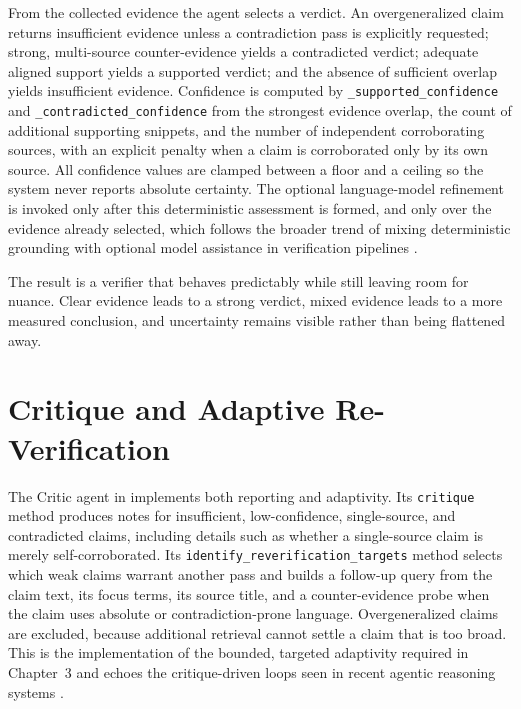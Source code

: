 From the collected evidence the agent selects a verdict. An overgeneralized claim returns insufficient evidence
unless a contradiction pass is explicitly requested; strong, multi-source counter-evidence yields a contradicted
verdict; adequate aligned support yields a supported verdict; and the absence of sufficient overlap yields
insufficient evidence. Confidence is computed by \texttt{\_supported\_confidence} and \texttt{\_contradicted\_confidence}
from the strongest evidence overlap, the count of additional supporting snippets, and the number of independent
corroborating sources, with an explicit penalty when a claim is corroborated only by its own source. All confidence
values are clamped between a floor and a ceiling so the system never reports absolute certainty. The optional
language-model refinement is invoked only after this deterministic assessment is formed, and only over the
evidence already selected, which follows the broader trend of mixing deterministic grounding with optional model
assistance in verification pipelines \cite{kadavath2022language,shinn2023reflexion,asai2024selfrag}.

The result is a verifier that behaves predictably while still leaving room for nuance. Clear evidence leads to a
strong verdict, mixed evidence leads to a more measured conclusion, and uncertainty remains visible rather than
being flattened away.

\section{Critique and Adaptive Re-Verification }

The Critic agent in  implements both reporting and adaptivity. Its \texttt{critique} method
produces notes for insufficient, low-confidence, single-source, and contradicted claims, including details such as
whether a single-source claim is merely self-corroborated. Its \texttt{identify\_reverification\_targets} method
selects which weak claims warrant another pass and builds a follow-up query from the claim text, its focus terms,
its source title, and a counter-evidence probe when the claim uses absolute or contradiction-prone language.
Overgeneralized claims are excluded, because additional retrieval cannot settle a claim that is too broad. This is
the implementation of the bounded, targeted adaptivity required in Chapter~3 and echoes the critique-driven loops
seen in recent agentic reasoning systems \cite{wu2023autogen,yao2023treeofthoughts,asai2024selfrag}.

